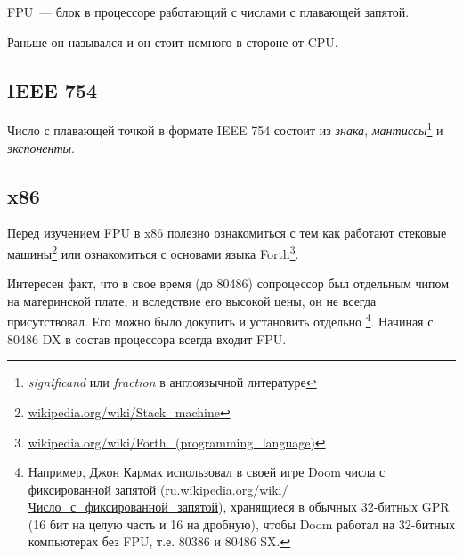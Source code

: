 \mysection{\FPUChapterName}
\label{sec:FPU}

\newcommand{\FNURLSTACK}{\footnote{\href{http://go.yurichev.com/17123}{wikipedia.org/wiki/Stack\_machine}}}
\newcommand{\FNURLFORTH}{\footnote{\href{http://go.yurichev.com/17124}{wikipedia.org/wiki/Forth\_(programming\_language)}}}
\newcommand{\FNURLIEEE}{\footnote{\href{http://go.yurichev.com/17125}{wikipedia.org/wiki/IEEE\_floating\_point}}}
\newcommand{\FNURLSP}{\footnote{\href{http://go.yurichev.com/17126}{wikipedia.org/wiki/Single-precision\_floating-point\_format}}}
\newcommand{\FNURLDP}{\footnote{\href{http://go.yurichev.com/17127}{wikipedia.org/wiki/Double-precision\_floating-point\_format}}}
\newcommand{\FNURLEP}{\footnote{\href{http://go.yurichev.com/17128}{wikipedia.org/wiki/Extended\_precision}}}

\ac{FPU}~--- блок в процессоре работающий с числами с плавающей запятой.

Раньше он назывался  и он стоит немного в стороне от \ac{CPU}.

\subsection{IEEE 754}

Число с плавающей точкой в формате IEEE 754 состоит из \emph{знака}, \emph{мантиссы}\footnote{\emph{significand} или \emph{fraction} 
в англоязычной литературе} и \emph{экспоненты}.

\subsection{x86}

Перед изучением \ac{FPU} в x86 полезно ознакомиться с тем как работают стековые машины\FNURLSTACK 
или ознакомиться с основами языка Forth\FNURLFORTH.

Интересен факт, что в свое время (до 80486) сопроцессор был отдельным чипом на материнской плате, 
и вследствие его высокой цены, он не всегда присутствовал. Его можно было докупить и установить отдельно
\footnote{Например, Джон Кармак использовал в своей игре Doom числа с фиксированной запятой 
(\href{http://go.yurichev.com/17357}{ru.wikipedia.org/wiki/Число\_с\_фиксированной\_запятой}), хранящиеся
в обычных 32-битных \ac{GPR} (16 бит на целую часть и 16 на дробную),
чтобы Doom работал на 32-битных компьютерах без FPU, т.е. 80386 и 80486 SX.}.
Начиная с 80486 DX в состав процессора всегда входит FPU.

